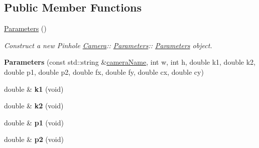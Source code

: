 \subsection*{Public Member Functions}
\begin{DoxyCompactItemize}
\item 
\mbox{\label{classcamodocal_1_1PinholeCamera_1_1Parameters_af5e1b14771df89124a16de2181790f99}} 
\hyperlink{classcamodocal_1_1PinholeCamera_1_1Parameters_af5e1b14771df89124a16de2181790f99}{Parameters} ()
\begin{DoxyCompactList}\small\item\em Construct a new Pinhole \hyperlink{classcamodocal_1_1Camera}{Camera}\+:\+: \hyperlink{classcamodocal_1_1PinholeCamera_1_1Parameters}{Parameters}\+:\+: \hyperlink{classcamodocal_1_1PinholeCamera_1_1Parameters}{Parameters} object. \end{DoxyCompactList}\item 
\mbox{\label{classcamodocal_1_1PinholeCamera_1_1Parameters_a349e1acee02237400b27fb6444369e7b}} 
{\bfseries Parameters} (const std\+::string \&\hyperlink{classcamodocal_1_1Camera_1_1Parameters_ad5d799e6367c5605907a941b2271e271}{camera\+Name}, int w, int h, double k1, double k2, double p1, double p2, double fx, double fy, double cx, double cy)
\item 
\mbox{\label{classcamodocal_1_1PinholeCamera_1_1Parameters_a1af6f243a1c96d4bfdc640a1541bcafc}} 
double \& {\bfseries k1} (void)
\item 
\mbox{\label{classcamodocal_1_1PinholeCamera_1_1Parameters_a2e1cb332c0df125fa3d897efe87625b2}} 
double \& {\bfseries k2} (void)
\item 
\mbox{\label{classcamodocal_1_1PinholeCamera_1_1Parameters_a8d2d6d102935760f33cd99cb1d6ec5d0}} 
double \& {\bfseries p1} (void)
\item 
\mbox{\label{classcamodocal_1_1PinholeCamera_1_1Parameters_a4ebeaaaa42322372e825bec4daf975a9}} 
double \& {\bfseries p2} (void)
\item 

\end{DoxyCompactItemize}
